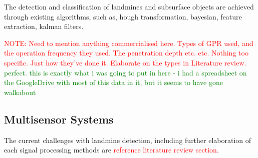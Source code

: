 \documentclass[main.tex]{subfiles}
\begin{document}
The detection and classification of landmines and subsurface objects are achieved through existing algorithms, such as, hough transformation, bayesian, feature extraction, kalman filters.   

\textcolor{red}{NOTE: Need to mention anything commercialised here. Types of GPR used, and the operation frequency they used. The penetration depth etc. etc. Nothing too specific. Just how they've done it. Elaborate on the types in Literature review.} \textcolor{green}{perfect. this is exactly what i was going to put in here - i had a spreadsheet on the GoogleDrive with most of this data in it, but it seems to have gone walkabout}




\subsection{Multisensor Systems}

The current challenges with landmine detection, including further elaboration of each signal processing methods are \textcolor{red}{reference literature review section}. 
\end{document}
